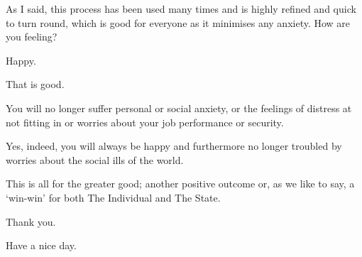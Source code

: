 As I said, this process has been used many times and is highly refined
and quick to turn round, which is good for everyone as it minimises
any anxiety.  How are you feeling?

Happy.

That is good.

You will no longer suffer personal or social anxiety, or the feelings
of distress at not fitting in or worries about your job performance or
security.

Yes, indeed, you will always be happy and furthermore no longer
troubled by worries about the social ills of the world.

This is all for the greater good; another positive outcome or, as we
like to say, a `win-win' for both The Individual and The State.

Thank you.

Have a nice day.
